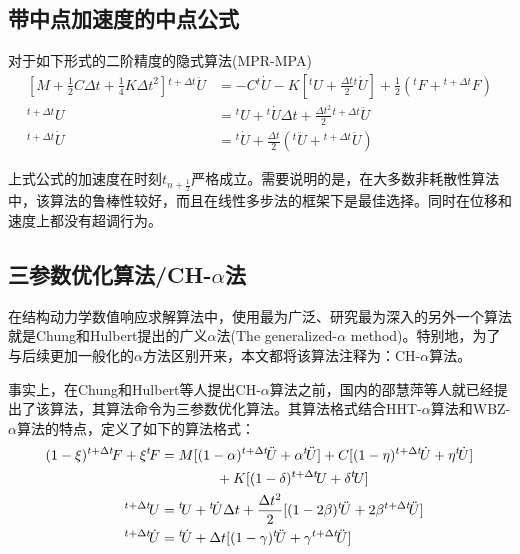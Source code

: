 \subsection{带中点加速度的中点公式}
对于如下形式的二阶精度的隐式算法\cite{Chopra2011a}(MPR-MPA)
\begin{subequations}
\begin{align}
\left[M+\frac{1}{2}C\Delta t+\frac{1}{4}K\Delta t^2\right]{^{t+\Delta t}\!\ddot{U}}&=-C{^t\!\dot{U}}-K\left[{^t\!U}+\frac{\Delta t}{2}{^t\!\dot{U}}\right]+\frac{1}{2}({^t\!F}+{^{t+\Delta t}\!F})\\
{^{t+\Delta t}\!U}&={^t\!U}+{^t\!\dot{U}}\Delta t+\frac{\Delta t^2}{2}{^{t+\Delta t}\!\ddot{U}}\\
{^{t+\Delta t}\!\dot{U}}&={^t\!\dot{U}}+\frac{\Delta t}{2}({^t\!\ddot{U}}+{^{t+\Delta t}\!\ddot{U}})
\end{align}
\end{subequations}

上式公式的加速度在时刻$t_{n+\frac{1}{2}}$严格成立。需要说明的是，在大多数非耗散性算法中，该算法的鲁棒性较好，而且在线性多步法的框架下是最佳选择。同时在位移和速度上都没有超调行为。

\subsection{三参数优化算法/CH-$\alpha$法}
在结构动力学数值响应求解算法中，使用最为广泛、研究最为深入的另外一个算法就是Chung和Hulbert提出的广义$\alpha$法(The generalized-$\alpha$ method)\cite{Chung1993a}。特别地，为了与后续更加一般化的$\alpha$方法\cite{Yu2008a}区别开来，本文都将该算法注释为：CH-$\alpha$算法。

事实上，在Chung和Hulbert等人提出CH-$\alpha$算法之前，国内的邵慧萍等人就已经提出了该算法，其算法命令为三参数优化算法\cite{ShaoHuiPing1988a}。其算法格式结合HHT-$\alpha$算法和WBZ-$\alpha$算法的特点，定义了如下的算法格式：
\begin{subequations}
\begin{align}
(1-\xi){^{t+\Delta t}\!F}+\xi{^t\!F}&=M[(1-\alpha){^{t+\Delta t}\!\ddot{U}}+\alpha {^t\!\ddot{U}}]+C[(1-\eta){^{t+\Delta t}\!\dot{U}}+\eta{^t\!\dot{U}}]\notag\\
&\qquad\qquad+K[(1-\delta){^{t+\Delta t}\!U}+\delta{^t\!U}]\\
{^{t+\Delta t}\!{U}}&={^t\!U}+{^t\!\dot{U}}\Delta t+\frac{\Delta t^2}{2}[(1-2\beta){^t\!\ddot{U}}+2\beta{^{t+\Delta t}\!\ddot{U}}]\\
{^{t+\Delta t}\!\dot{U}}&={^t\!\dot{U}}+\Delta t[(1-\gamma){^t\!\ddot{U}}+\gamma{^{t+\Delta t}\!\ddot{U}}]
\end{align}
\end{subequations}

